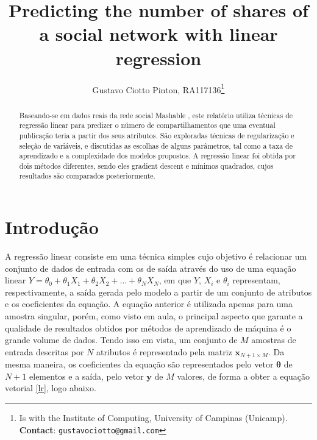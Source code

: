 \documentclass[10pt,twocolumn,letterpaper]{article}
\begin{document}
\title {Predicting the number of shares of a social network with linear regression }
\author{Gustavo Ciotto Pinton, RA117136\thanks{Is with the Institute of Computing, University of Campinas (Unicamp). \textbf{Contact}: \tt\small{gustavociotto@gmail.com}}}

\maketitle
\begin{abstract}
Baseando-se em dados reais da rede social Mashable \cite{database}, este relatório utiliza técnicas de regressão linear para predizer o número de compartilhamentos que uma eventual publicação teria a partir dos seus atributos. São exploradas técnicas de regularização e seleção de variáveis, e discutidas as escolhas de alguns parâmetros, tal como a taxa de aprendizado e a complexidade dos modelos propostos. A regressão linear foi obtida por dois métodos diferentes, sendo eles gradient descent e mínimos quadrados, cujos resultados são comparados posteriormente.
\end{abstract}

\section{Introdução}
\label{intro}

A regressão linear consiste em uma técnica simples cujo objetivo é relacionar um conjunto de dados de entrada com os de saída através do uso de uma equação linear \(Y = \theta_0 + \theta_1X_1 + \theta_2X_2 + \ldots + \theta_NX_N\), em que \(Y\), \(X_i\) e \(\theta_i\) representam, respectivamente, a saída gerada pelo modelo a partir de um conjunto de atributos e os coeficientes da equação. A equação anterior é utilizada apenas para uma amostra singular, porém, como visto em aula, o principal aspecto que garante a qualidade de resultados obtidos por métodos de aprendizado de máquina é o grande volume de dados. Tendo isso em vista, um conjunto de \(M\) amostras de entrada descritas por \(N\) atributos é representado pela matriz \(\bm{x}_{N+1\times M}\). Da mesma maneira, os coeficientes da equação são representados pelo vetor \(\bm{\theta}\) de \(N+1\) elementos e a saída, pelo vetor \(\bm{y}\) de \(M\) valores, de forma a obter a equação vetorial \ref{lr}, logo abaixo.
\end{document}
